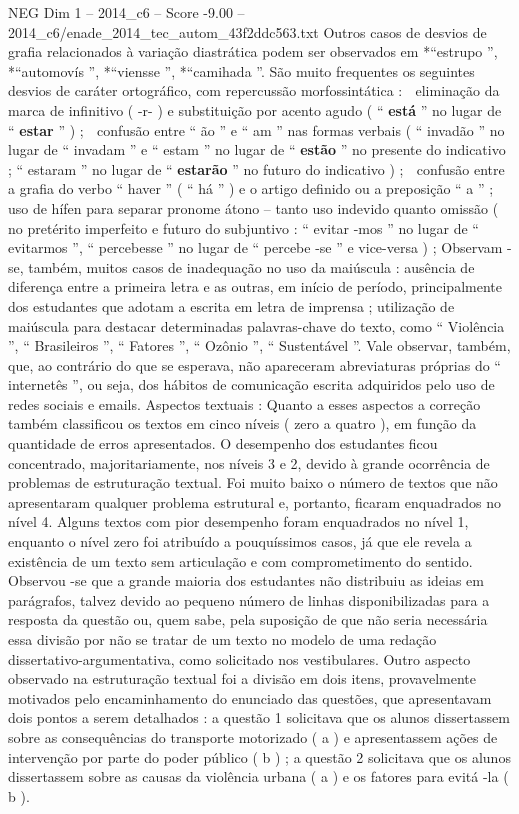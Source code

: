 \begin{textsample}{NEG Dim 1 – 2014\_c6 – Score -9.00 – 2014\_c6/enade\_2014\_tec\_autom\_43f2ddc563.txt}
Outros casos de desvios de grafia relacionados à variação diastrática podem ser observados em *“estrupo ”, *“automovís ”, *“viensse ”, *“camihada ”.
São muito frequentes os seguintes desvios de caráter ortográfico, com repercussão morfossintática :  eliminação da marca de infinitivo ( -r- ) e substituição por acento agudo ( “ \textbf{está} ” no lugar de “ \textbf{estar} ” ) ;  confusão entre “ ão ” e “ am ” nas formas verbais ( “ invadão ” no lugar de “ invadam ” e “ estam ” no lugar de “ \textbf{estão} ” no presente do indicativo ; “ estaram ” no lugar de “ \textbf{estarão} ” no futuro do indicativo ) ;  confusão entre a grafia do verbo “ haver ” ( “ há ” ) e o artigo definido ou a preposição “ a ” ;  uso de hífen para separar pronome átono – tanto uso indevido quanto omissão ( no pretérito imperfeito e futuro do subjuntivo : “ evitar -mos ” no lugar de “ evitarmos ”, “ percebesse ” no lugar de “ percebe -se ” e vice-versa ) ; Observam -se, também, muitos casos de inadequação no uso da maiúscula : ausência de diferença entre a primeira letra e as outras, em início de período, principalmente dos estudantes que adotam a escrita em letra de imprensa ; utilização de maiúscula para destacar determinadas palavras-chave do texto, como “ Violência ”, “ Brasileiros ”, “ Fatores ”, “ Ozônio ”, “ Sustentável ”.
Vale observar, também, que, ao contrário do que se esperava, não apareceram abreviaturas próprias do “ internetês ”, ou seja, dos hábitos de comunicação escrita adquiridos pelo uso de redes sociais e emails.
Aspectos textuais : Quanto a esses aspectos a correção também classificou os textos em cinco níveis ( zero a quatro ), em função da quantidade de erros apresentados.
O desempenho dos estudantes ficou concentrado, majoritariamente, nos níveis 3 e 2, devido à grande ocorrência de problemas de estruturação textual.
Foi muito baixo o número de textos que não apresentaram qualquer problema estrutural e, portanto, ficaram enquadrados no nível 4.
Alguns textos com pior desempenho foram enquadrados no nível 1, enquanto o nível zero foi atribuído a pouquíssimos casos, já que ele revela a existência de um texto sem articulação e com comprometimento do sentido.
Observou -se que a grande maioria dos estudantes não distribuiu as ideias em parágrafos, talvez devido ao pequeno número de linhas disponibilizadas para a resposta da questão ou, quem sabe, pela suposição de que não seria necessária essa divisão por não se tratar de um texto no modelo de uma redação dissertativo-argumentativa, como solicitado nos vestibulares.
Outro aspecto observado na estruturação textual foi a divisão em dois itens, provavelmente motivados pelo encaminhamento do enunciado das questões, que apresentavam dois pontos a serem detalhados : a questão 1 solicitava que os alunos dissertassem sobre as consequências do transporte motorizado ( a ) e apresentassem ações de intervenção por parte do poder público ( b ) ; a questão 2 solicitava que os alunos dissertassem sobre as causas da violência urbana ( a ) e os fatores para evitá -la ( b ).

\end{textsample}
